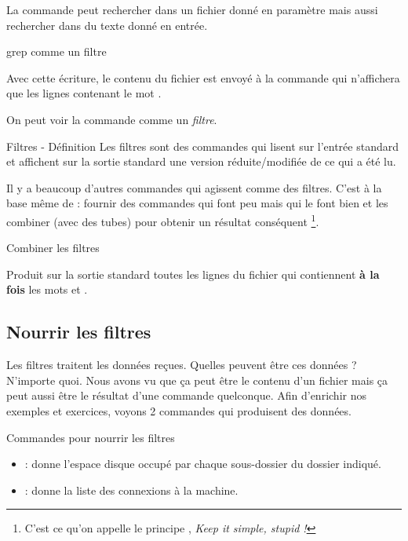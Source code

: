 \documentclass[a4paper,11pt]{style-esi/td}
\begin{document}
		La commande 
		peut rechercher dans un fichier donné en paramètre
		mais aussi rechercher dans du texte donné en entrée.

		\begin{Exemple}{grep comme un filtre}
			
			\medskip
			Avec cette écriture, le contenu du fichier 
			est envoyé à la commande  qui n'affichera
			que les lignes contenant le mot .
		\end{Exemple}

		On peut voir la commande comme un \emph{filtre}.

		\begin{theorie}{Filtres - Définition}
			Les filtres sont des commandes qui lisent sur l'entrée standard
			et affichent sur la sortie standard 
			une version réduite/modifiée de ce qui a été lu.
		\end{theorie}
	
		Il y a beaucoup d'autres commandes qui agissent comme des filtres.
		C'est à la base même de  : fournir des commandes qui font peu 
		mais qui le font bien et les combiner (avec des tubes)
		pour obtenir un résultat conséquent%
		\footnote{%
			C'est ce qu'on appelle le principe , 
			\emph{Keep it simple, stupid !}
		}.

\newpage

		\begin{Exemple}{Combiner les filtres}
			
			\medskip
			Produit sur la sortie standard toutes les lignes du fichier
			 qui contiennent \textbf{à la fois}
			les mots  et .
		\end{Exemple}

	\subsection{Nourrir les filtres}
	
		Les filtres traitent les données reçues.
		Quelles peuvent être ces données ? N'importe quoi.
		Nous avons vu que ça peut être le contenu d'un fichier
		mais ça peut aussi être le résultat d'une commande quelconque.
		Afin d'enrichir nos exemples et exercices, 
		voyons 2 commandes qui produisent des données.

		\begin{theorie}{Commandes pour nourrir les filtres}
			\begin{itemize}
			\item 
				 : 
				donne l'espace disque occupé par chaque sous-dossier
				du dossier indiqué.
			\item 
				 : 
				donne la liste des connexions à la machine.
			\end{itemize}
		\end{theorie}
\end{document}
